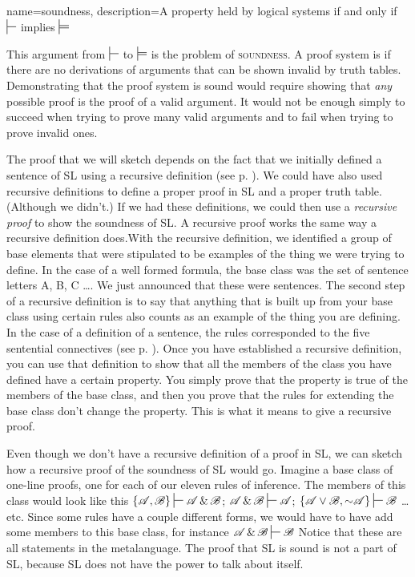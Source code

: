 {
{
name=soundness,
description={A property held by logical systems if and only if $\sststile{}{}$ implies $\sdtstile{}{}$}
}

This argument from $\sststile{}{}$ to $\sdtstile{}{}$ is the problem of \textsc{\gls{soundness}}. \label{def:soundness} A proof system is  if there are no derivations of arguments that can be shown invalid by truth tables. \label{def_Soundness} Demonstrating that the proof system is sound would require showing that \emph{any} possible proof is the proof of a valid argument. It would not be enough simply to succeed when trying to prove many valid arguments and to fail when trying to prove invalid ones.

The proof that we will sketch depends on the fact that we initially defined a sentence of SL using a recursive definition (see p. \pageref{def:recursive_definition}). We could have also used recursive definitions to define a proper proof in SL and a proper truth table. (Although we didn't.) If we had these definitions, we could then use a \emph{recursive proof} to show the soundness of SL. A recursive proof works the same way a recursive definition does.With the recursive definition, we identified a group of base elements that were stipulated to be examples of the thing we were trying to define. In the case of a well formed formula, the base class was the set of sentence letters A, B, C \ldots{}. We just announced that these were sentences. The second step of a recursive definition is to say that anything that is built up from your base class using certain rules also counts as an example of the thing you are defining. In the case of a definition of a sentence, the rules corresponded to the five sentential connectives (see p. \pageref{def:sentence_of_SL}). Once you have established a recursive definition, you can use that definition to show that all the members of the class you have defined have a certain property. You simply prove that the property is true of the members of the base class, and then you prove that the rules for extending the base class don't change the property. This is what it means to give a recursive proof.

Even though we don't have a recursive definition of a proof in SL, we can sketch how a recursive proof of the soundness of SL would go. Imagine a base class of one-line proofs, one for each of our eleven rules of inference. The members of this class would look like this $\{\script{A}, \script{B}\} \sststile{}{} \script{A} \eand \script{B}$; $\script{A} \eand \script{B} \sststile{}{}\script{A}$; $\{\script{A} \eor \script{B}, \enot\script{A}\} \sststile{}{} \script{B}$ \ldots{} etc. Since some rules have a couple different forms, we would have to have add some members to this base class, for instance $\script{A} \eand \script{B} \sststile{}{} \script{B}$ Notice that these are all statements in the metalanguage. The proof that SL is sound is not a part of SL, because SL does not have the power to talk about itself. 

}
